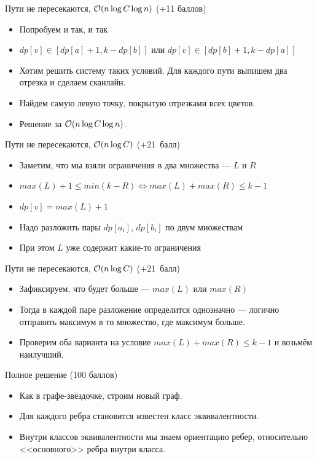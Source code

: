 \begin{frame}{Пути не пересекаются, $\mathcal{O}(n \log C \log n)$ (+11 баллов)}
  \begin{itemize}
    \item Попробуем и так, и так
    \item $dp[v] \in [dp[a] + 1, k - dp[b]]$ или $dp[v] \in [dp[b] + 1, k - dp[a]]$
    \item Хотим решить систему таких условий. Для каждого пути выпишем два отрезка и сделаем сканлайн.
    \item Найдем самую левую точку, покрытую отрезками всех цветов.
    \item Решение за $\mathcal{O}(n \log C \log n)$.
  \end{itemize}
\end{frame}

\begin{frame}{Пути не пересекаются, $\mathcal{O}(n \log C)$ (+21~балл)}
  \begin{itemize}
    \item Заметим, что мы взяли ограничения в два множества --- $L$ и $R$
    \item $max(L) + 1 \le min(k - R) \iff max(L) + max(R) \le k - 1$
    \item $dp[v] = max(L) + 1$
    \item Надо разложить пары $dp[a_i],\,dp[b_i]$ по двум множествам
    \item При этом $L$ уже содержит какие-то ограничения
  \end{itemize}
\end{frame}

\begin{frame}{Пути не пересекаются, $\mathcal{O}(n \log C)$ (+21~балл)}
  \begin{itemize}
    \item Зафиксируем, что будет больше --- $max(L)$ или $max(R)$
    \item Тогда в каждой паре разложение определится однозначно --- логично отправить максимум в то множество, где максимум больше.
    \item Проверим оба варианта на условие $max(L) + max(R) \le k - 1$ и возьмём наилучший.
  \end{itemize}
\end{frame}

\begin{frame}{Полное решение (100 баллов)}
  \begin{itemize}
    \item Как в графе-звёздочке, строим новый граф.
    \item Для каждого ребра становится известен класс эквивалентности.
    \item Внутри классов эквивалентности мы знаем ориентацию ребер, относительно <<основного>> ребра внутри класса.
  \end{itemize}
\end{frame}

